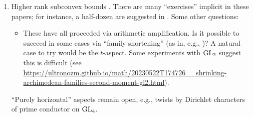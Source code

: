 \documentclass[reqno]{amsart} 
\begin{document}
\begin{enumerate}
\item Higher rank subconvex bounds \cite{MR4203038, 2023arXiv2309.16667, 2020arXiv201202187N, 2021arXiv210915230N, 2023arXiv2309.06314}.  There are many ``exercises'' implicit in these papers; for instance, a half-dozen are suggested in \cite[Remark 1.4]{2020arXiv201202187N}.  Some other questions:
  \begin{itemize}
  \item These have all proceeded via arithmetic amplification.  Is it possible to succeed in some cases via ``family shortening'' (as in, e.g., \cite{Sar01})?  A natural case to try would be the $t$-aspect.  Some experiments with $\operatorname{GL}_2$ suggest this is difficult (see \url{https://ultronozm.github.io/math/20230522T174726__shrinking-archimedean-families-second-moment-gl2.html}).
  \end{itemize} ``Purely horizontal'' aspects remain open, e.g., twists by Dirichlet characters of prime conductor on $\operatorname{GL}_4$.

\end{enumerate}


{} 
\end{document}
